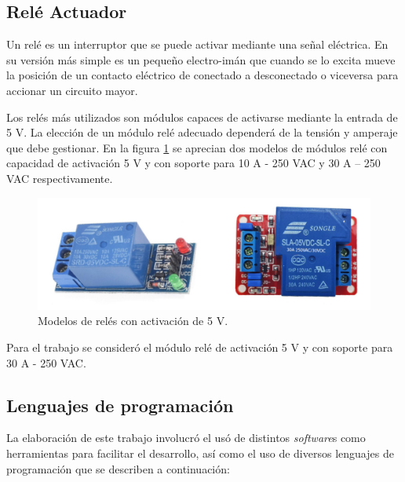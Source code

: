 



\subsection{Relé Actuador}

Un relé es un interruptor que se puede activar mediante una señal eléctrica. En su versión más simple es un pequeño electro-imán que cuando se lo excita mueve la posición de un contacto eléctrico de conectado a desconectado o viceversa para accionar un circuito mayor. 

Los relés más utilizados son módulos capaces de activarse mediante la entrada de 5 V. La elección de un módulo relé adecuado dependerá de la tensión y amperaje que debe gestionar. En la figura \ref{fig:rele} se aprecian dos modelos de módulos relé con capacidad de activación 5 V y con soporte para 10 A - 250 VAC y 30 A – 250 VAC respectivamente.


\begin{figure}[htbp]
	\centering
	\includegraphics[width=1.0\textwidth]{./Figures/rele.jpg}
	\caption{Modelos de relés con activación de 5 V.}

	\label{fig:rele}
\end{figure}


Para el trabajo se consideró el módulo relé de activación 5 V y con soporte para 30 A - 250 VAC.

\subsection{Lenguajes de programación}

La elaboración de este trabajo involucró el usó de distintos \emph{software}s como herramientas para facilitar el desarrollo, así como el uso de diversos lenguajes de programación que se describen a continuación:

